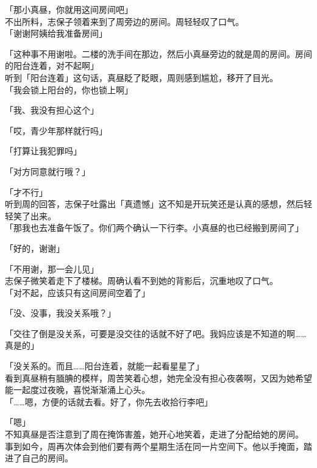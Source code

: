「那小真昼，你就用这间房间吧」\\

不出所料，志保子领着来到了周旁边的房间。周轻轻叹了口气。\\

「谢谢阿姨给我准备房间」

「这种事不用谢啦。二楼的洗手间在那边，然后小真昼旁边的就是周的房间。房间的阳台连着，对不起啊」\\

听到「阳台连着」这句话，真昼眨了眨眼，周则感到尴尬，移开了目光。\\

「我会锁上阳台的，你也锁上啊」

「我、我没有担心这个」

「哎，青少年那样就行吗」

「打算让我犯罪吗」

「对方同意就行哦？」

「才不行」\\

听到周的回答，志保子吐露出「真遗憾」这不知是开玩笑还是认真的感想，然后轻轻笑了出来。\\

「那我也去准备午饭了。你们两个确认一下行李。小真昼的也已经搬到房间了」

「好的，谢谢」

「不用谢，那一会儿见」\\

志保子微笑着走下了楼梯。周确认看不到她的背影后，沉重地叹了口气。\\

「对不起，应该只有这间房间空着了」

「没、没事，我没关系哦？」

「交往了倒是没关系，可要是没交往的话就不好了吧。我妈应该是不知道的啊……真是的」

「没关系的。而且……阳台连着，就能一起看星星了」\\

看到真昼稍有腼腆的模样，周苦笑着心想，她完全没有担心夜袭啊，又因为她希望能一起度过夜晚，喜悦渐渐涌上心头。\\

「……嗯，方便的话就去看。好了，你先去收拾行李吧」

「嗯」\\

不知真昼是否注意到了周在掩饰害羞，她开心地笑着，走进了分配给她的房间。\\

事到如今，周再次体会到他们要有两个星期生活在同一片空间下。他以手掩面，踏进了自己的房间。\\

